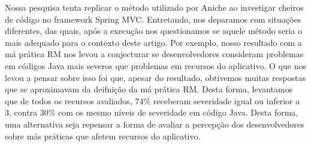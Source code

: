 Nossa pesquisa tenta replicar o método utilizado por Aniche \cite{FinavaroAniche2016} ao investigar cheiros de código no framework Spring MVC. Entretando, nos deparamos com situações diferentes, das quais, após a execução nos questionamos se aquele método seria o mais adequado para o contexto deste artigo. Por exemplo, nosso resultado com a má prática RM nos levou a conjecturar se desenvolvedores consideram problemas em códigos Java mais severos que problemas em recursos do aplicativo. O que nos levou a pensar sobre isso foi que, apesar do resultado, obtivemos muitas respostas que se aproximavam da deifnição da má prática RM. Desta forma, levantamos que de todos os recursos avaliados, 74\% receberam severidade igual ou inferior a 3, contra 30\% com os mesmo níveis de severidade em código Java. Desta forma, uma alternativa seja repensar a forma de avaliar a percepção dos desenvolvedores sobre más práticas que afetem recursos do aplicativo.

